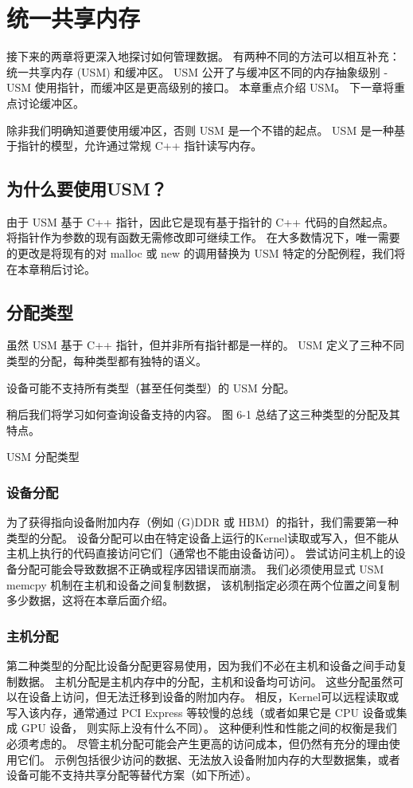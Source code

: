 \section{统一共享内存}
接下来的两章将更深入地探讨如何管理数据。 有两种不同的方法可以相互补充：统一共享内存 (USM) 和缓冲区。 
USM 公开了与缓冲区不同的内存抽象级别 - USM 使用指针，而缓冲区是更高级别的接口。 
本章重点介绍 USM。 下一章将重点讨论缓冲区。

除非我们明确知道要使用缓冲区，否则 USM 是一个不错的起点。 
USM 是一种基于指针的模型，允许通过常规 C++ 指针读写内存。

\subsection{为什么要使用USM？}
由于 USM 基于 C++ 指针，因此它是现有基于指针的 C++ 代码的自然起点。 
将指针作为参数的现有函数无需修改即可继续工作。 
在大多数情况下，唯一需要的更改是将现有的对 malloc 或 new 的调用替换为 USM 特定的分配例程，我们将在本章稍后讨论。

\subsection{分配类型}
虽然 USM 基于 C++ 指针，但并非所有指针都是一样的。 USM 定义了三种不同类型的分配，每种类型都有独特的语义。

设备可能不支持所有类型（甚至任何类型）的 USM 分配。

稍后我们将学习如何查询设备支持的内容。 图 6-1 总结了这三种类型的分配及其特点。

{\color{red} USM 分配类型}

\subsubsection{设备分配}
为了获得指向设备附加内存（例如 (G)DDR 或 HBM）的指针，我们需要第一种类型的分配。 
设备分配可以由在特定设备上运行的Kernel读取或写入，但不能从主机上执行的代码直接访问它们（通常也不能由设备访问）。 
尝试访问主机上的设备分配可能会导致数据不正确或程序因错误而崩溃。 
我们必须使用显式 USM memcpy 机制在主机和设备之间复制数据，
该机制指定必须在两个位置之间复制多少数据，这将在本章后面介绍。

\subsubsection{主机分配}
第二种类型的分配比设备分配更容易使用，因为我们不必在主机和设备之间手动复制数据。 
主机分配是主机内存中的分配，主机和设备均可访问。 这些分配虽然可以在设备上访问，但无法迁移到设备的附加内存。 
相反，Kernel可以远程读取或写入该内存，通常通过 PCI Express 等较慢的总线（或者如果它是 CPU 设备或集成 GPU 设备，
则实际上没有什么不同）。 这种便利性和性能之间的权衡是我们必须考虑的。 
尽管主机分配可能会产生更高的访问成本，但仍然有充分的理由使用它们。 
示例包括很少访问的数据、无法放入设备附加内存的大型数据集，或者设备可能不支持共享分配等替代方案（如下所述）。

